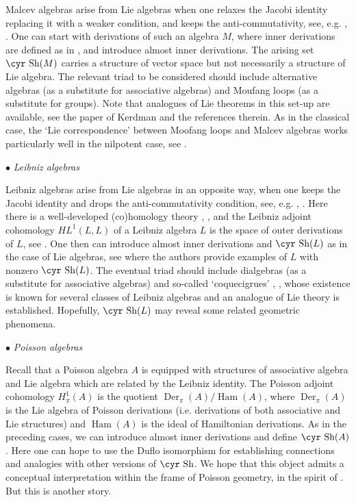 \documentclass[11pt,reqno]{amsart}
\numberwithin{equation}{section}
\theoremstyle{definition}
\newcommand{\Der}{{\operatorname{ Der}}}
\newcommand{\Ham}{{\operatorname{ Ham}}}
\def\Sha{\text{\cyr Sh}}
\begin{document}
Malcev algebras arise from Lie algebras when one relaxes the Jacobi identity replacing it with a weaker condition,
and keeps the anti-commutativity, see, e.g. \cite{Sag}, \cite{KS}.
One can start with derivations of such an algebra $M$, where inner derivations are defined as in \cite{Sch},
and introduce almost inner derivations.
The arising set $\Sha (M)$ carries a structure of vector space but not necessarily a structure of Lie algebra.
The relevant triad to be considered should include alternative algebras (as a substitute for associative algebras) and
Moufang loops (as a substitute for groups). Note that analogues of Lie theorems in this set-up are available, see the paper
of Kerdman \cite{Ke} and the references therein. As in the classical case, the `Lie correspondence' between Moofang loops
and Malcev algebras works particularly well in the nilpotent case, see \cite{GRSS}.

\medskip

$\bullet$ {\it Leibniz algebras}

Leibniz algebras arise from Lie algebras in an opposite way, when one keeps the Jacobi identity and drops
the anti-commutativity condition, see, e.g. \cite{Lo1}, \cite{AOR}. Here there is a well-developed (co)homology theory
\cite{LP}, \cite{Pi}, and the Leibniz adjoint cohomology $HL^1(L,L)$ of a Leibniz algebra $L$ is the
space of outer derivations of $L$, see \cite{LP}. One then can introduce almost inner derivations and $\Sha (L)$ as in the case of Lie algebras,
see \cite{AdKu} where the authors provide examples of $L$ with nonzero $\Sha (L)$.
The eventual triad should include dialgebras \cite{Lo3} (as a substitute for associative algebras)
and so-called `coquecigrues' \cite{Lo2}, \cite{JP}, whose existence is known for several classes of Leibniz algebras
and an analogue of Lie theory is established. Hopefully, $\Sha (L)$ may reveal some related geometric phenomena.

\medskip

$\bullet$ {\it Poisson algebras}

Recall that a Poisson algebra $A$ is equipped with structures of associative algebra and Lie algebra which are
related by the Leibniz identity. The Poisson adjoint cohomology $H^1_{\pi}(A)$ is the quotient
$\Der_{\pi}(A)/\Ham(A)$, where $\Der_{\pi}(A)$ is the Lie algebra of Poisson derivations (i.e. derivations of both
associative and Lie structures) and $\Ham (A)$ is the ideal of Hamiltonian derivations. %
As in the preceding cases, we can introduce almost inner derivations and define $\Sha (A)$.
Here one can hope to use the Duflo isomorphism \cite{PT} for establishing connections and analogies
with other versions of $\Sha$. We hope that this object admits a conceptual interpretation within the frame
of Poisson geometry, in the spirit of \cite{Wei}. But this is another story.
\end{document}
